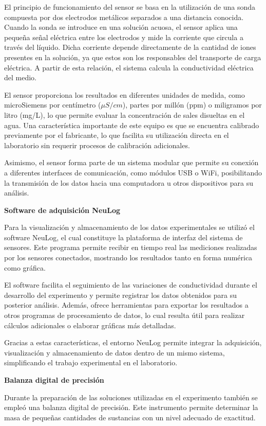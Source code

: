 \documentclass[a4paper,openany,12pt]{book}
\begin{document}
El principio de funcionamiento del sensor se basa en la utilización de
una sonda compuesta por dos electrodos metálicos separados a una
distancia conocida. Cuando la sonda se introduce en una solución
acuosa, el sensor aplica una pequeña señal eléctrica entre los
electrodos y mide la corriente que circula a través del líquido.
Dicha corriente depende directamente de la cantidad de iones presentes
en la solución, ya que estos son los responsables del transporte de
carga eléctrica. A partir de esta relación, el sistema calcula la
conductividad eléctrica del medio.

El sensor proporciona los resultados en diferentes unidades de medida,
como microSiemens por centímetro ($\mu S/cm$), partes por millón (ppm)
o miligramos por litro (mg/L), lo que permite evaluar la concentración
de sales disueltas en el agua. Una característica importante de este
equipo es que se encuentra calibrado previamente por el fabricante,
lo que facilita su utilización directa en el laboratorio sin requerir
procesos de calibración adicionales.

Asimismo, el sensor forma parte de un sistema modular que permite
su conexión a diferentes interfaces de comunicación, como módulos
USB o WiFi, posibilitando la transmisión de los datos hacia una
computadora u otros dispositivos para su análisis.

\textbf{Software de adquisición NeuLog}

Para la visualización y almacenamiento de los datos experimentales se
utilizó el software NeuLog, el cual constituye la plataforma de
interfaz del sistema de sensores. Este programa permite recibir en
tiempo real las mediciones realizadas por los sensores conectados,
mostrando los resultados tanto en forma numérica como gráfica.

El software facilita el seguimiento de las variaciones de conductividad
durante el desarrollo del experimento y permite registrar los datos
obtenidos para su posterior análisis. Además, ofrece herramientas para
exportar los resultados a otros programas de procesamiento de datos,
lo cual resulta útil para realizar cálculos adicionales o elaborar
gráficas más detalladas.

Gracias a estas características, el entorno NeuLog permite integrar la
adquisición, visualización y almacenamiento de datos dentro de un mismo
sistema, simplificando el trabajo experimental en el laboratorio.

\textbf{Balanza digital de precisión}

Durante la preparación de las soluciones utilizadas en el experimento
también se empleó una balanza digital de precisión. Este instrumento
permite determinar la masa de pequeñas cantidades de sustancias con
un nivel adecuado de exactitud.
\end{document}
